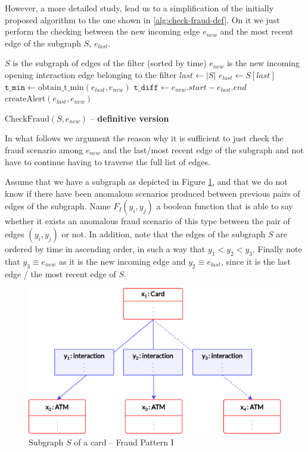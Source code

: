 \documentclass{article}
\begin{document}
However, a more detailed study, lead us to a simplification of the initially proposed algorithm to the one shown in \ref{alg:check-fraud-def}. On it we just perform the checking between the new incoming edge $e_{new}$ and the most recent edge of the subgraph $S$, $e_{last}$.

\begin{algorithm}[H]
  \small
  \begin{algorithmic}[1]
  \REQUIRE $S$ is the subgraph of edges of the filter (sorted by time)
  \REQUIRE $e_{new}$ is the new incoming opening interaction edge belonging to the filter 
  \STATE $last \gets |S|$
  \STATE $e_{last} \gets S[last]$
  \STATE $\texttt{t\_min} \gets \text{obtain\_t\_min}(e_{last}, e_{new})$
  \STATE $\texttt{t\_diff} \gets e_{new}.start - e_{last}.end$
    \STATE $\text{createAlert}(e_{last}, e_{new})$
  \ENDIF
  \end{algorithmic}
  \caption{$\text{CheckFraud}(S, e_{new})$ -- \textbf{definitive version}}
  \label{alg:check-fraud-def}
\end{algorithm}


In what follows we argument the reason why it is sufficient to just check the fraud scenario among $e_{new}$ and the last/most recent edge of the subgraph and not have to continue having to traverse the full list of edges.

Assume that we have a subgraph as depicted in Figure \ref{img:fp-I-demo}, and that we do not know if there have been anomalous scenarios produced between previous pairs of edges of the subgraph. Name $F_I(y_i,y_j)$ a boolean function that is able to say whether it exists an anomalous fraud scenario of this type between the pair of edges $(y_i,y_j)$ or not. In addition, note that the edges of the subgraph $S$ are ordered by time in ascending order, in such a way that $y_1 < y_2 < y_3$. Finally note that $y_3 \equiv e_{new}$ as it is the new incoming edge and $y_2 \equiv e_{last}$, since it is the last edge / the most recent edge of $S$.

\begin{figure}[H]
  \centering
  \includegraphics[scale = 0.6]{images/fp-I-demo-1.png}
  \caption{Subgraph $S$ of a card -- Fraud Pattern I}
  \label{img:fp-I-demo}
\end{figure}
\end{document}
